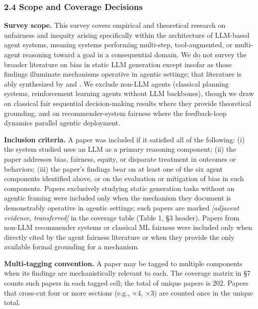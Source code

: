 \documentclass[10pt]{article}
\begin{document}
\subsubsection*{2.4 Scope and Coverage Decisions}

\textbf{Survey scope.} This survey covers empirical and theoretical research on unfairness and inequity arising specifically within the architecture of LLM-based agent systems, meaning systems performing multi-step, tool-augmented, or multi-agent reasoning toward a goal in a consequential domain. We do not survey the broader literature on bias in static LLM generation except insofar as those findings illuminate mechanisms operative in agentic settings; that literature is ably synthesized by \cite{gallegos2024bias} and \cite{chu2024fairness}. We exclude non-LLM agents (classical planning systems, reinforcement learning agents without LLM backbones), though we draw on classical fair sequential decision-making results \cite{hu2022achieving,xu2024adapting} where they provide theoretical grounding, and on recommender-system fairness \cite{zehlike2022fairness,wang2023survey} where the feedback-loop dynamics parallel agentic deployment.

\textbf{Inclusion criteria.} A paper was included if it satisfied all of the following: (i) the system studied uses an LLM as a primary reasoning component; (ii) the paper addresses bias, fairness, equity, or disparate treatment in outcomes or behaviors; (iii) the paper's findings bear on at least one of the six agent components identified above, or on the evaluation or mitigation of bias in such components. Papers exclusively studying static generation tasks without an agentic framing were included only when the mechanism they document is demonstrably operative in agentic settings; such papers are marked \emph{[adjacent evidence, transferred]} in the coverage table (Table 1, \S{}3 header). Papers from non-LLM recommender systems or classical ML fairness were included only when directly cited by the agent fairness literature or when they provide the only available formal grounding for a mechanism.

\textbf{Multi-tagging convention.} A paper may be tagged to multiple components when its findings are mechanistically relevant to each. The coverage matrix in \S{}7 counts such papers in each tagged cell; the total of unique papers is 202. Papers that cross-cut four or more sections (e.g., \cite{gallegos2024bias} $\times$4, \cite{fan2024fairmt} $\times$3) are counted once in the unique total.
\end{document}
